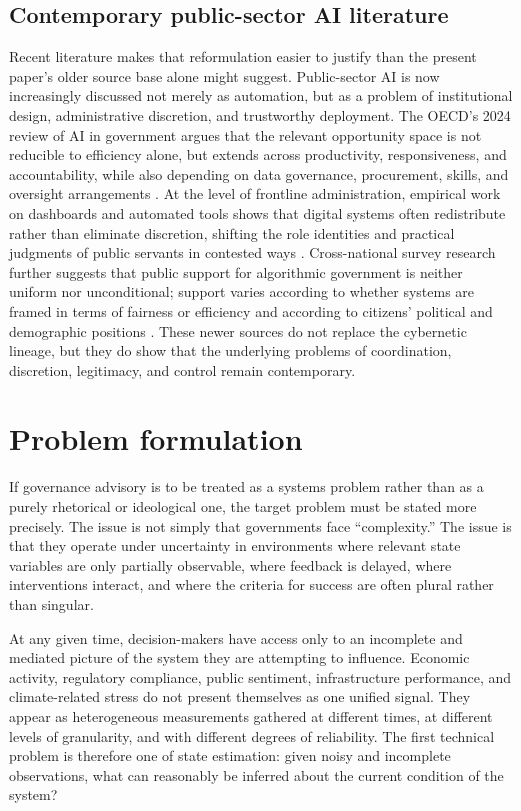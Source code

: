 \documentclass[11pt]{article}
\begin{document}
\subsection{Contemporary public-sector AI literature}

Recent literature makes that reformulation easier to justify than the present paper's older source base alone might suggest. Public-sector AI is now increasingly discussed not merely as automation, but as a problem of institutional design, administrative discretion, and trustworthy deployment. The OECD's 2024 review of AI in government argues that the relevant opportunity space is not reducible to efficiency alone, but extends across productivity, responsiveness, and accountability, while also depending on data governance, procurement, skills, and oversight arrangements \citep{oecd2024governing}. At the level of frontline administration, empirical work on dashboards and automated tools shows that digital systems often redistribute rather than eliminate discretion, shifting the role identities and practical judgments of public servants in contested ways \citep{kersing2022digital,marienfeldt2024digital}. Cross-national survey research further suggests that public support for algorithmic government is neither uniform nor unconditional; support varies according to whether systems are framed in terms of fairness or efficiency and according to citizens' political and demographic positions \citep{sidhu2024citizens}. These newer sources do not replace the cybernetic lineage, but they do show that the underlying problems of coordination, discretion, legitimacy, and control remain contemporary.

\section{Problem formulation}

If governance advisory is to be treated as a systems problem rather than as a purely rhetorical or ideological one, the target problem must be stated more precisely. The issue is not simply that governments face ``complexity.'' The issue is that they operate under uncertainty in environments where relevant state variables are only partially observable, where feedback is delayed, where interventions interact, and where the criteria for success are often plural rather than singular.

At any given time, decision-makers have access only to an incomplete and mediated picture of the system they are attempting to influence. Economic activity, regulatory compliance, public sentiment, infrastructure performance, and climate-related stress do not present themselves as one unified signal. They appear as heterogeneous measurements gathered at different times, at different levels of granularity, and with different degrees of reliability. The first technical problem is therefore one of state estimation: given noisy and incomplete observations, what can reasonably be inferred about the current condition of the system?
\end{document}
